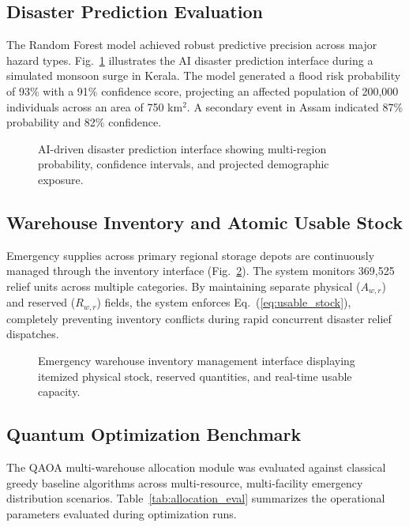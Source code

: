 \documentclass[conference]{IEEEtran}
\begin{document}
\subsection{Disaster Prediction Evaluation}
The Random Forest model achieved robust predictive precision across major hazard types. Fig.~\ref{fig:prediction} illustrates the AI disaster prediction interface during a simulated monsoon surge in Kerala. The model generated a flood risk probability of 93\% with a 91\% confidence score, projecting an affected population of 200,000 individuals across an area of 750 km$^2$. A secondary event in Assam indicated 87\% probability and 82\% confidence.

\begin{figure}[h]
\centering
\fbox{\rule{0pt}{1.8in} \rule{0.9\linewidth}{0pt}}
\caption{AI-driven disaster prediction interface showing multi-region probability, confidence intervals, and projected demographic exposure.}
\label{fig:prediction}
\end{figure}

\subsection{Warehouse Inventory and Atomic Usable Stock}
Emergency supplies across primary regional storage depots are continuously managed through the inventory interface (Fig.~\ref{fig:inventory}). The system monitors 369,525 relief units across multiple categories. By maintaining separate physical ($A_{w,r}$) and reserved ($R_{w,r}$) fields, the system enforces Eq.~(\ref{eq:usable_stock}), completely preventing inventory conflicts during rapid concurrent disaster relief dispatches.

\begin{figure}[h]
\centering
\fbox{\rule{0pt}{1.8in} \rule{0.9\linewidth}{0pt}}
\caption{Emergency warehouse inventory management interface displaying itemized physical stock, reserved quantities, and real-time usable capacity.}
\label{fig:inventory}
\end{figure}

\subsection{Quantum Optimization Benchmark}
The QAOA multi-warehouse allocation module was evaluated against classical greedy baseline algorithms across multi-resource, multi-facility emergency distribution scenarios. Table~\ref{tab:allocation_eval} summarizes the operational parameters evaluated during optimization runs.
\end{document}
